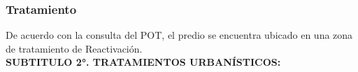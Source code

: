 \documentclass[12pt,a4paper,twoside]{article}
\begin{document}


\subsubsection{Tratamiento}


De acuerdo con la consulta del POT, el predio se encuentra ubicado en una zona de tratamiento de Reactivación. \\

\textbf{SUBTITULO 2°. TRATAMIENTOS URBANÍSTICOS:} \\
\end{document}
